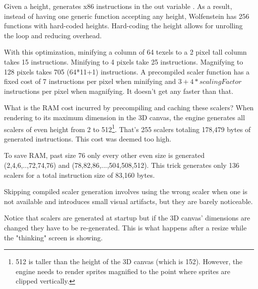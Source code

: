 \par
\begin{minipage}{\textwidth}

\end{minipage}
\par
Given a height,  generates x86 instructions in the out variable . As a result, instead of having one generic function accepting any height,  Wolfenstein has 256 functions with hard-coded heights. Hard-coding the height allows for unrolling the loop and reducing overhead.\\
\par
With this optimization, minifying a column of 64 texels to a 2 pixel tall column takes 15 instructions. Minifying to 4 pixels take 25 instructions. Magnifying to 128 pixels takes 705 (64*11+1) instructions. A precompiled scaler function has a fixed cost of 7 instructions per pixel when minifying and $3+4*scalingFactor$ instructions per pixel when magnifying. It doesn't get any faster than that.\\
\par
What is the RAM cost incurred by precompiling and caching these scalers? When rendering to its maximum dimension in the 3D canvas, the engine generates all scalers of even height from 2 to 512\footnote{512 is taller than the height of the 3D canvas (which is 152). However, the engine needs to render sprites magnified to the point where sprites are clipped vertically.}. That's 255 scalers totaling 178,479 bytes of generated instructions. This cost was deemed too high.\\
\par 
To save RAM, past size 76 only every other even size is generated (2,4,6,..,72,74,76) and (78,82,86,...,504,508,512). This trick generates only 136 scalers for a total instruction size of 83,160 bytes.\\
\par
Skipping compiled scaler generation involves using the wrong scaler when one is not available and introduces small visual artifacts, but they are barely noticeable.\\
\par
Notice that scalers are generated at startup but if the 3D canvas' dimensions are changed they have to be re-generated. This is what happens after a resize while the "thinking" screen is showing.
\begin{figure}[H]
 \centering
\end{figure}







